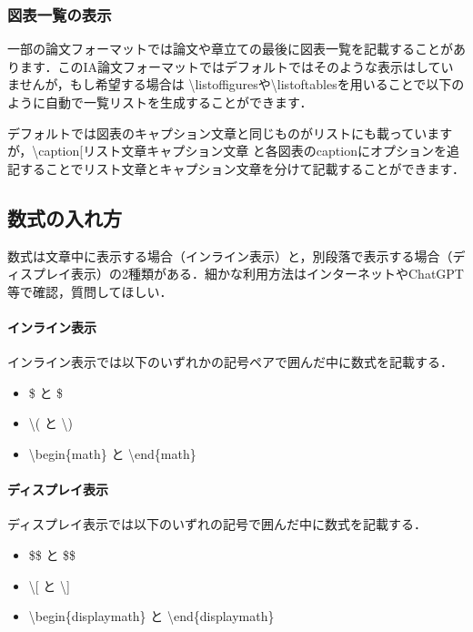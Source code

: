 \documentclass[a4paper,uplatex]{jsarticle}
\begin{document}
\subsubsection{図表一覧の表示}
一部の論文フォーマットでは論文や章立ての最後に図表一覧を記載することがあります．このIA論文フォーマットではデフォルトではそのような表示はしていませんが，もし希望する場合は \textbackslash{listoffigures}や\textbackslash{listoftables}を用いることで以下のように自動で一覧リストを生成することができます．

\listoffigures  %
\listoftables   %

デフォルトでは図表のキャプション文章と同じものがリストにも載っていますが，\textbackslash{caption[リスト文章}{キャプション文章} と各図表のcaptionにオプションを追記することでリスト文章とキャプション文章を分けて記載することができます．

\subsection{数式の入れ方}
数式は文章中に表示する場合（インライン表示）と，別段落で表示する場合（ディスプレイ表示）の2種類がある．細かな利用方法はインターネットやChatGPT等で確認，質問してほしい．

\paragraph{インライン表示}
インライン表示では以下のいずれかの記号ペアで囲んだ中に数式を記載する．
\begin{itemize}
    \item \$ と \$
    \item \textbackslash{(} と \textbackslash{)}
    \item \textbackslash begin\{math\} と \textbackslash end\{math\}
\end{itemize}


\paragraph{ディスプレイ表示}
ディスプレイ表示では以下のいずれの記号で囲んだ中に数式を記載する．
\begin{itemize}
    \item \$\$ と \$\$
    \item \textbackslash{[} と \textbackslash{]}
    \item \textbackslash begin\{displaymath\} と \textbackslash end\{displaymath\}
\end{itemize}
\end{document}

